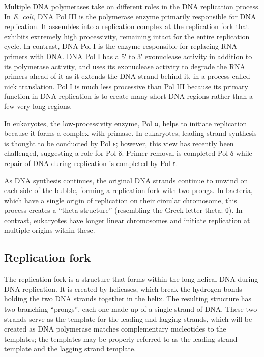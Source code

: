Multiple DNA polymerases take on different roles in the DNA replication process. In \emph{E. coli}, DNA Pol III is the polymerase enzyme primarily responsible for DNA replication. It assembles into a replication complex at the replication fork that exhibits extremely high processivity, remaining intact for the entire replication cycle. In contrast, DNA Pol I is the enzyme responsible for replacing RNA primers with DNA. DNA Pol I has a 5′ to 3′ exonuclease activity in addition to its polymerase activity, and uses its exonuclease activity to degrade the RNA primers ahead of it as it extends the DNA strand behind it, in a process called nick translation. Pol I is much less processive than Pol III because its primary function in DNA replication is to create many short DNA regions rather than a few very long regions.

In eukaryotes, the low-processivity enzyme, Pol α, helps to initiate replication because it forms a complex with primase. In eukaryotes, leading strand synthesis is thought to be conducted by Pol ε; however, this view has recently been challenged, suggesting a role for Pol δ. Primer removal is completed Pol δ while repair of DNA during replication is completed by Pol ε.

As DNA synthesis continues, the original DNA strands continue to unwind on each side of the bubble, forming a replication fork with two prongs. In bacteria, which have a single origin of replication on their circular chromosome, this process creates a ``theta structure'' (resembling the Greek letter theta: θ). In contrast, eukaryotes have longer linear chromosomes and initiate replication at multiple origins within these.

\hypertarget{replication-fork}{%
\subsection{Replication fork}\label{replication-fork}}

The replication fork is a structure that forms within the long helical DNA during DNA replication. It is created by helicases, which break the hydrogen bonds holding the two DNA strands together in the helix. The resulting structure has two branching ``prongs'', each one made up of a single strand of DNA. These two strands serve as the template for the leading and lagging strands, which will be created as DNA polymerase matches complementary nucleotides to the templates; the templates may be properly referred to as the leading strand template and the lagging strand template.

